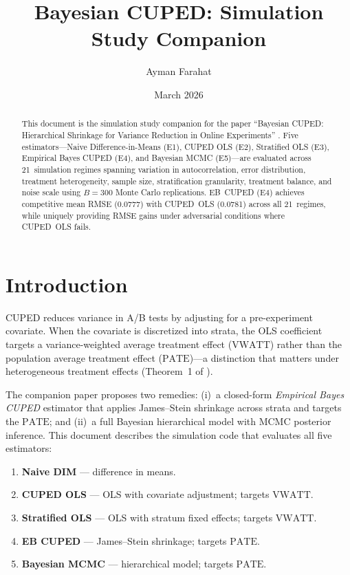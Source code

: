 \documentclass[11pt,letterpaper]{article}
\title{\textbf{Bayesian CUPED: Simulation Study Companion}}
\author{Ayman Farahat}
\date{March 2026}
\newcommand{\PATE}{\text{PATE}}
\newcommand{\VWATT}{\text{VWATT}}
\begin{document}
\maketitle

\begin{abstract}
This document is the simulation study companion for the paper
``Bayesian CUPED: Hierarchical Shrinkage for Variance Reduction in Online
Experiments'' \citep{farahat2026}.
Five estimators---Naive Difference-in-Means (E1), CUPED OLS (E2),
Stratified OLS (E3), Empirical Bayes CUPED (E4), and Bayesian MCMC
(E5)---are evaluated across 21~simulation regimes spanning variation in
autocorrelation, error distribution, treatment heterogeneity, sample
size, stratification granularity, treatment balance, and noise scale
using $B = 300$ Monte Carlo replications.
EB~CUPED (E4) achieves competitive mean RMSE (0.0777) with CUPED~OLS
(0.0781) across all 21~regimes, while uniquely providing RMSE gains
under adversarial conditions where CUPED~OLS fails.
\end{abstract}

\tableofcontents
\newpage

\section{Introduction}\label{sec:intro}

CUPED \citep{deng2013improving} reduces variance in A/B tests by
adjusting for a pre-experiment covariate.  When the covariate is
discretized into strata, the OLS coefficient targets a
variance-weighted average treatment effect ($\VWATT$) rather than
the population average treatment effect ($\PATE$)---a distinction
that matters under heterogeneous treatment effects (Theorem~1 of
\citet{farahat2026}).

The companion paper proposes two remedies: (i)~a closed-form
\emph{Empirical Bayes CUPED} estimator that applies James--Stein
shrinkage across strata and targets the $\PATE$; and (ii)~a full
Bayesian hierarchical model with MCMC posterior inference.  This
document describes the simulation code that evaluates all five
estimators:
\begin{enumerate}[label=E\arabic*.,leftmargin=2em]
  \item \textbf{Naive DIM} --- difference in means.
  \item \textbf{CUPED OLS} --- OLS with covariate adjustment; targets $\VWATT$.
  \item \textbf{Stratified OLS} --- OLS with stratum fixed effects; targets $\VWATT$.
  \item \textbf{EB CUPED} --- James--Stein shrinkage; targets $\PATE$.
  \item \textbf{Bayesian MCMC} --- hierarchical model; targets $\PATE$.
\end{enumerate}
\end{document}
